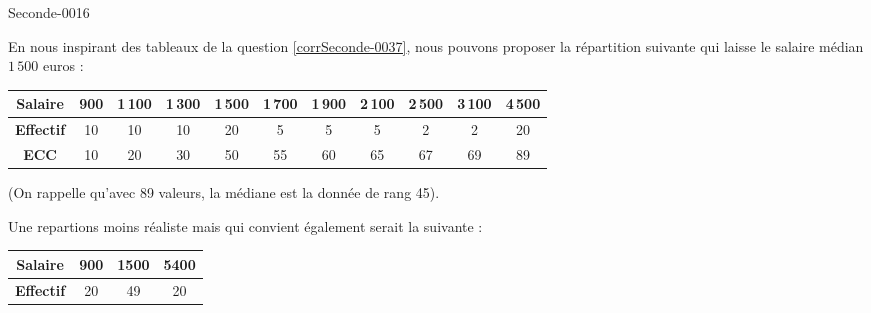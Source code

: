 
\begin{corrige}{Seconde-0016}

  
    En nous inspirant des tableaux de la question \ref{corrSeconde-0037}, nous pouvons proposer la répartition suivante qui laisse le salaire médian $1\,500$ euros :

  \begin{center}
  \begin{tabular}{|c||c|c|c|c|c|c|c|c|c|c|}
    \hline 
    \textbf{Salaire} &900&1\,100&1\,300&1\,500&1\,700&1\,900&2\,100&2\,500&3\,100&4\,500\\
    \hline 
    \textbf{Effectif} &10&10&10&20&5&5&5&2&2&20\\
    \hline 
    \textbf{ECC} &10&20&30&50&55&60&65&67&69&89\\
    \hline
  \end{tabular}
  \end{center}

  (On rappelle qu'avec 89 valeurs, la médiane est la donnée de rang
  45).

  Une repartions moins réaliste mais qui convient également serait la suivante :
  \begin{center}
      \begin{tabular}[h]{|c||c|c|c|}
          \hline
          \textbf{Salaire} & 900&1500&5400\\
          \hline
          \textbf{Effectif}&20&49&20\\
          \hline
      \end{tabular}
  \end{center}

\end{corrige}
